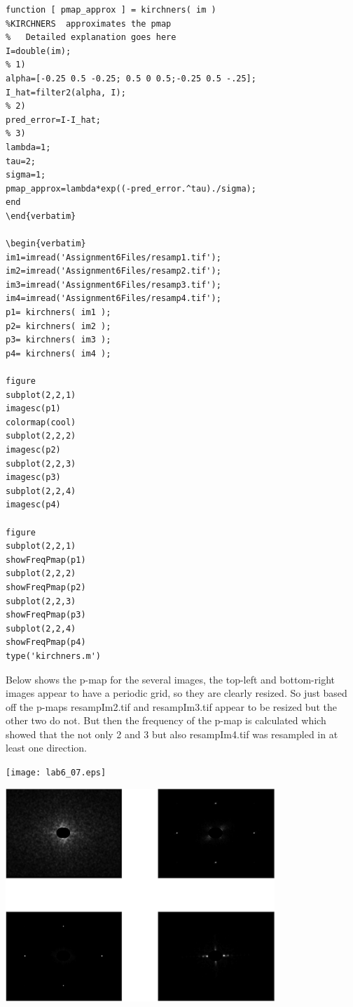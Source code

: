 \documentclass{article}
\begin{document}
\begin{lstlisting}
function [ pmap_approx ] = kirchners( im )
%KIRCHNERS  approximates the pmap 
%   Detailed explanation goes here
I=double(im); 
% 1)
alpha=[-0.25 0.5 -0.25; 0.5 0 0.5;-0.25 0.5 -.25]; 
I_hat=filter2(alpha, I); 
% 2)
pred_error=I-I_hat; 
% 3)
lambda=1; 
tau=2; 
sigma=1; 
pmap_approx=lambda*exp((-pred_error.^tau)./sigma); 
end
\end{verbatim} 

\begin{verbatim}
im1=imread('Assignment6Files/resamp1.tif');
im2=imread('Assignment6Files/resamp2.tif');
im3=imread('Assignment6Files/resamp3.tif');
im4=imread('Assignment6Files/resamp4.tif');
p1= kirchners( im1 );
p2= kirchners( im2 );
p3= kirchners( im3 );
p4= kirchners( im4 );

figure
subplot(2,2,1)
imagesc(p1)
colormap(cool)
subplot(2,2,2)
imagesc(p2)
subplot(2,2,3)
imagesc(p3)
subplot(2,2,4)
imagesc(p4)

figure
subplot(2,2,1)
showFreqPmap(p1)
subplot(2,2,2)
showFreqPmap(p2)
subplot(2,2,3)
showFreqPmap(p3)
subplot(2,2,4)
showFreqPmap(p4)
type('kirchners.m')
\end{lstlisting}
    

Below shows the p-map for the several images, the top-left and bottom-right
images appear to have a periodic grid, so they are clearly resized. So just
based off the p-maps resampIm2.tif and resampIm3.tif appear to be resized
but the other two do not. But then the frequency of the p-map is calculated
which showed that the not only 2 and 3 but also resampIm4.tif was resampled
in at least one direction. 


\texttt{[image: lab6\_07.eps]}

\includegraphics [width=4in]{lab6_08.eps}
\end{document}
